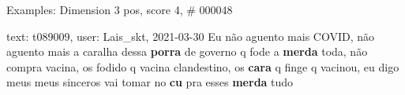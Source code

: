\begin{frame}{Examples: Dimension 3 pos, score 4, \# 000048}
\footnotesize
\begin{exampleblock}{text: t089009, user: Lais\_skt, 2021-03-30}
Eu não aguento mais COVID, não aguento mais a caralha dessa \textbf{porra} de 
governo q fode a \textbf{merda} toda, não compra vacina, os fodido q vacina 
clandestino, os \textbf{cara} q finge q vacinou, eu digo meus meus sinceros vai 
tomar no \textbf{cu} pra esses \textbf{merda} tudo 
\end{exampleblock}
\end{frame}
